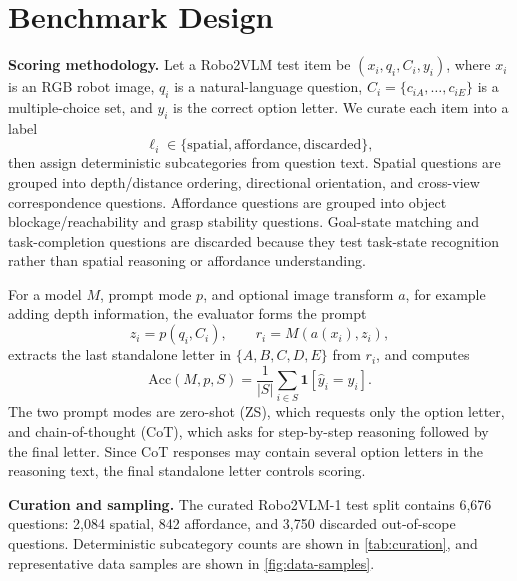 \section{Benchmark Design}
\label{sec:method}

\textbf{Scoring methodology.}
Let a Robo2VLM test item be $(x_i,q_i,C_i,y_i)$, where $x_i$ is an RGB robot image, $q_i$ is a natural-language question, $C_i=\{c_{iA},\ldots,c_{iE}\}$ is a multiple-choice set, and $y_i$ is the correct option letter. We curate each item into a label
\begin{equation}
    \ell_i \in \{\mathrm{spatial},\mathrm{affordance},\mathrm{discarded}\},
\end{equation}
then assign deterministic subcategories from question text. Spatial questions are grouped into depth/distance ordering, directional orientation, and cross-view correspondence questions. Affordance questions are grouped into object blockage/reachability and grasp stability questions. Goal-state matching and task-completion questions are discarded because they test task-state recognition rather than spatial reasoning or affordance understanding.

For a model $M$, prompt mode $p$, and optional image transform $a$, for example adding depth information, the evaluator forms the prompt
\begin{equation}
    z_i = p(q_i,C_i), \qquad r_i = M(a(x_i),z_i),
\end{equation}
extracts the last standalone letter in $\{A,B,C,D,E\}$ from $r_i$, and computes
\begin{equation}
    \mathrm{Acc}(M,p,S) =
    \frac{1}{|S|}\sum_{i \in S}\mathbf{1}[\hat{y}_i=y_i].
\end{equation}
The two prompt modes are zero-shot (ZS), which requests only the option letter, and chain-of-thought (CoT), which asks for step-by-step reasoning followed by the final letter. Since CoT responses may contain several option letters in the reasoning text, the final standalone letter controls scoring.

\textbf{Curation and sampling.}
The curated Robo2VLM-1 test split contains 6,676 questions: 2,084 spatial, 842 affordance, and 3,750 discarded out-of-scope questions. Deterministic subcategory counts are shown in \cref{tab:curation}, and representative data samples are shown in \cref{fig:data-samples}.

